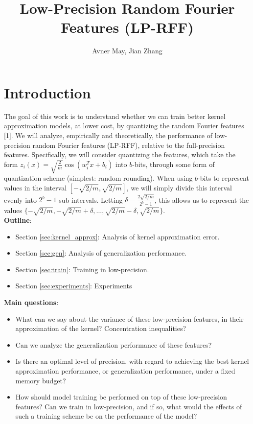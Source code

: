 \documentclass[12pt]{article}
\begin{document}
\title{Low-Precision Random Fourier Features (LP-RFF)}
\author{Avner May, Jian Zhang}
\onehalfspacing
\maketitle

\section{Introduction}
\label{sec:intro}
The goal of this work is to understand whether we can train better kernel approximation models, at lower cost,
by quantizing the random Fourier features [1].  We will analyze, empirically and theoretically, the performance of low-precision random Fourier features (LP-RFF), relative to the full-precision features.  Specifically, we will consider quantizing the features, which take the form $z_i(x) = \sqrt{\frac{2}{m}} \cos(w_i^Tx+b_i)$ into $b$-bits, through some form of quantization scheme (simplest: random rounding). 
When using $b$-bits to represent values in the interval $[-\sqrt{2/m},\sqrt{2/m}]$, we will simply divide this interval evenly into $2^b-1$ sub-intervals.  Letting $\delta = \frac{2\sqrt{2/m}}{2^b-1}$, this allows us to represent the values $\{-\sqrt{2/m},-\sqrt{2/m} + \delta,\ldots,\sqrt{2/m}-\delta, \sqrt{2/m}\}$. \\

\noindent \textbf{Outline}:
\begin{itemize}
	\item Section \ref{sec:kernel_approx}: Analysis of kernel approximation error.
	\item Section \ref{sec:gen}: Analysis of generalization performance.
	\item Section \ref{sec:train}: Training in low-precision.
	\item Section \ref{sec:experiments}: Experiments
\end{itemize}

\noindent \textbf{Main questions}:
\begin{itemize}
	\item What can we say about the variance of these low-precision features, in their approximation of the kernel?  Concentration inequalities?
	\item Can we analyze the generalization performance of these features?
	\item Is there an optimal level of precision, with regard to achieving the best kernel approximation performance, or generalization performance, under a fixed memory budget?
	\item How should model training be performed on top of these low-precision features? Can we train in low-precision, and if so, what would the effects of such a training scheme be on the performance of the model?
\end{itemize}
\end{document}
